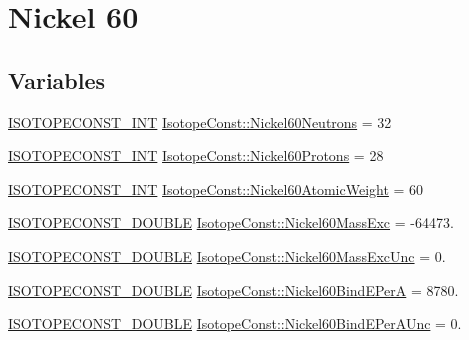 \hypertarget{group___isotope_const-_nickel-_ni60}{}\section{Nickel 60}
\label{group___isotope_const-_nickel-_ni60}
\subsection*{Variables}
\begin{DoxyCompactItemize}
\item 
\mbox{\hyperlink{group___isotope_const-_macros_ga5f18360b3e99483a35c32d789e62621c}{I\+S\+O\+T\+O\+P\+E\+C\+O\+N\+S\+T\+\_\+\+I\+NT}} \mbox{\hyperlink{group___isotope_const-_nickel-_ni60_ga5f5828a6988999251bc05b86ebf8bb4d}{Isotope\+Const\+::\+Nickel60\+Neutrons}} = 32
\item 
\mbox{\hyperlink{group___isotope_const-_macros_ga5f18360b3e99483a35c32d789e62621c}{I\+S\+O\+T\+O\+P\+E\+C\+O\+N\+S\+T\+\_\+\+I\+NT}} \mbox{\hyperlink{group___isotope_const-_nickel-_ni60_gad5830c4d8b72760e4710756fa30e30de}{Isotope\+Const\+::\+Nickel60\+Protons}} = 28
\item 
\mbox{\hyperlink{group___isotope_const-_macros_ga5f18360b3e99483a35c32d789e62621c}{I\+S\+O\+T\+O\+P\+E\+C\+O\+N\+S\+T\+\_\+\+I\+NT}} \mbox{\hyperlink{group___isotope_const-_nickel-_ni60_ga3ae47d82e75d1a19fbb2cb160740c4f8}{Isotope\+Const\+::\+Nickel60\+Atomic\+Weight}} = 60
\item 
\mbox{\hyperlink{group___isotope_const-_macros_ga8f45a7272ce02c0b4c65c44636ed719a}{I\+S\+O\+T\+O\+P\+E\+C\+O\+N\+S\+T\+\_\+\+D\+O\+U\+B\+LE}} \mbox{\hyperlink{group___isotope_const-_nickel-_ni60_gac19117b1f52ff122776d23a1cd3ccbc3}{Isotope\+Const\+::\+Nickel60\+Mass\+Exc}} = -\/64473.
\item 
\mbox{\hyperlink{group___isotope_const-_macros_ga8f45a7272ce02c0b4c65c44636ed719a}{I\+S\+O\+T\+O\+P\+E\+C\+O\+N\+S\+T\+\_\+\+D\+O\+U\+B\+LE}} \mbox{\hyperlink{group___isotope_const-_nickel-_ni60_gae3b06a88b09635e89df33bfb5ba59ce0}{Isotope\+Const\+::\+Nickel60\+Mass\+Exc\+Unc}} = 0.
\item 
\mbox{\hyperlink{group___isotope_const-_macros_ga8f45a7272ce02c0b4c65c44636ed719a}{I\+S\+O\+T\+O\+P\+E\+C\+O\+N\+S\+T\+\_\+\+D\+O\+U\+B\+LE}} \mbox{\hyperlink{group___isotope_const-_nickel-_ni60_gab8c26c28ff3767afa6efea4aec0b3af6}{Isotope\+Const\+::\+Nickel60\+Bind\+E\+PerA}} = 8780.
\item 
\mbox{\hyperlink{group___isotope_const-_macros_ga8f45a7272ce02c0b4c65c44636ed719a}{I\+S\+O\+T\+O\+P\+E\+C\+O\+N\+S\+T\+\_\+\+D\+O\+U\+B\+LE}} \mbox{\hyperlink{group___isotope_const-_nickel-_ni60_ga941260ac1079e35add5e83908ed8c1d8}{Isotope\+Const\+::\+Nickel60\+Bind\+E\+Per\+A\+Unc}} = 0.

\end{DoxyCompactItemize}
